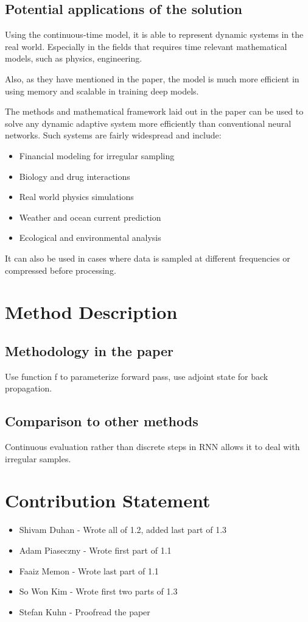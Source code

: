 \documentclass{article}
\begin{document}
\subsection{Potential applications of the solution}
Using the continuous-time model, it is able to represent dynamic systems in the real world. Especially in the fields that requires time relevant mathematical models, such as physics, engineering.

Also, as they have mentioned in the paper, the model is much more efficient in using memory and scalable in training deep models.

The methods and mathematical framework laid out in the paper can be used to solve any dynamic adaptive system more efficiently than conventional neural networks. Such systems are fairly widespread and include:

\begin{itemize}
    \item Financial modeling for irregular sampling
    \item Biology and drug interactions
    \item Real world physics simulations
    \item Weather and ocean current prediction
    \item Ecological and environmental analysis
\end{itemize}

It can also be used in cases where data is sampled at different frequencies or compressed before processing.

\section{Method Description}

\subsection{Methodology in the paper}
Use function f to parameterize forward pass, use adjoint state for back propagation.

\subsection{Comparison to other methods} 
Continuous evaluation rather than discrete steps in RNN allows it to deal with irregular samples.

\section{Contribution Statement}
\begin{itemize}
    \item Shivam Duhan - Wrote all of 1.2, added last part of 1.3
    \item Adam Piaseczny - Wrote first part of 1.1
    \item Faaiz Memon - Wrote last part of 1.1
    \item So Won Kim - Wrote first two parts of 1.3
    \item Stefan Kuhn - Proofread the paper
\end{itemize}
    
\end{document}

